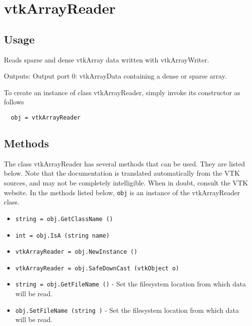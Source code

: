 \section{vtkArrayReader}

\subsection{Usage}

 Reads sparse and dense vtkArray data written with vtkArrayWriter.

 Outputs:
   Output port 0: vtkArrayData containing a dense or sparse array.


To create an instance of class vtkArrayReader, simply
invoke its constructor as follows
\begin{verbatim}
  obj = vtkArrayReader
\end{verbatim}
\subsection{Methods}

The class vtkArrayReader has several methods that can be used.
  They are listed below.
Note that the documentation is translated automatically from the VTK sources,
and may not be completely intelligible.  When in doubt, consult the VTK website.
In the methods listed below, \verb|obj| is an instance of the vtkArrayReader class.
\begin{itemize}
\item  \verb|string = obj.GetClassName ()|

\item  \verb|int = obj.IsA (string name)|

\item  \verb|vtkArrayReader = obj.NewInstance ()|

\item  \verb|vtkArrayReader = obj.SafeDownCast (vtkObject o)|

\item  \verb|string = obj.GetFileName ()| -  Set the filesystem location from which data will be read.

\item  \verb|obj.SetFileName (string )| -  Set the filesystem location from which data will be read.

\end{itemize}
